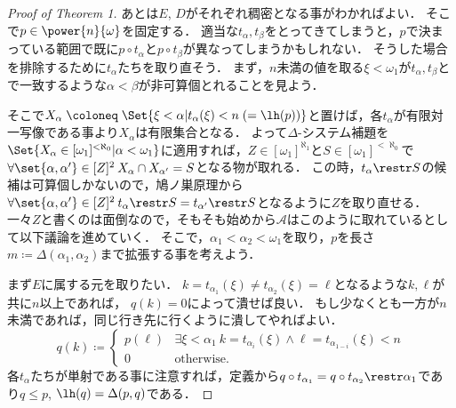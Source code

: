 \documentclass[a4j]{ltjsarticle}
\renewcommand{\defeq}{\mathrel{\coloneq}}
\begin{document}
\begin{proof}[Proof of Theorem 1]
 あとは$E$, $D$がそれぞれ稠密となる事がわかればよい．
 そこで$p \in \power{n}{\omega}$を固定する．
 適当な$t_\alpha, t_\beta$をとってきてしまうと，$p$で決まっている範囲で既に$p \circ t_\alpha$と$p \circ t_\beta$が異なってしまうかもしれない．
 そうした場合を排除するために$t_\alpha$たちを取り直そう．
 まず，$n$未満の値を取る$\xi < \omega_1$が$t_\alpha, t_\beta$とで一致するような$\alpha < \beta$が非可算個とれることを見よう．

 そこで$X_\alpha \defeq \Set{\xi < \alpha | t_{\alpha}(\xi) < n\; (= \lh(p))}$と置けば，各$t_\alpha$が有限対一写像である事より$X_\alpha$は有限集合となる．
 よって$\Delta$-システム補題を$\Set{X_\alpha \in [\omega_1]^{<\aleph_0} | \alpha < \omega_1}$に適用すれば，$Z \in [\omega_1]^{\aleph_1}$と$S \in [\omega_1]^{<\aleph_0}$で$\forall \set{\alpha, \alpha'} \in [Z]^2\: X_\alpha \cap X_{\alpha'} = S$となる物が取れる．
 この時，$t_\alpha \restr S$の候補は可算個しかないので，鳩ノ巣原理から$\forall \set{\alpha, \alpha'} \in [Z]^2 \: t_\alpha \restr S = t_{\alpha'} \restr S$となるように$Z$を取り直せる．
 一々$Z$と書くのは面倒なので，そもそも始めから$\mathcal{A}$はこのように取れているとして以下議論を進めていく．
 そこで，$\alpha_1 < \alpha_2 < \omega_1$を取り，$p$を長さ$m \defeq \Delta(\alpha_1, \alpha_2)$まで拡張する事を考えよう．

 まず$E$に属する元を取りたい．
 $k = t_{\alpha_1}(\xi) \neq t_{\alpha_2}(\xi) = \ell$となるような$k, \ell$が共に$n$以上であれば，
 $q(k) = 0$によって潰せば良い．
 もし少なくとも一方が$n$未満であれば，同じ行き先に行くように潰してやればよい．
 \[
  q(k) \defeq \begin{cases}
               p(\ell) & \exists \xi < \alpha_1 \: k = t_{\alpha_i}(\xi) \wedge \ell = t_{\alpha_{1-i}}(\xi) < n\\
               0 & \text{otherwise}.
              \end{cases}
 \]
 各$t_\alpha$たちが単射である事に注意すれば，定義から$q \circ t_{\alpha_1} = q \circ t_{\alpha_2} \restr \alpha_1$であり$q \leq p$, $\lh(q) = \Delta(p, q)$である．


\end{proof}
\end{document}
